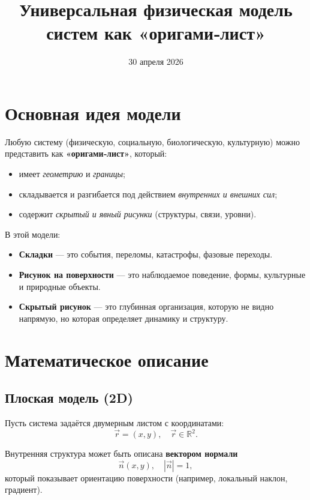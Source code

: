 \documentclass[12pt]{article}
\title{Универсальная физическая модель\\систем как «оригами‑лист»}
\author{}
\date{30 апреля 2026}
\begin{document}
\maketitle

\tableofcontents
\newpage

\section{Основная идея модели}

Любую систему (физическую, социальную, биологическую, культурную) можно представить как \textbf{«оригами‑лист»}, который:

\begin{itemize}
  \item имеет \emph{геометрию} и \emph{границы};
  \item складывается и разгибается под действием \emph{внутренних и внешних сил};
  \item содержит \emph{скрытый и явный рисунки} (структуры, связи, уровни).
\end{itemize}

В этой модели:
\begin{itemize}
  \item \textbf{Складки} — это события, переломы, катастрофы, фазовые переходы.
  \item \textbf{Рисунок на поверхности} — это наблюдаемое поведение, формы, культурные и природные объекты.
  \item \textbf{Скрытый рисунок} — это глубинная организация, которую не видно напрямую, но которая определяет динамику и структуру.
\end{itemize}

\section{Математическое описание}

\subsection{Плоская модель (2D)}

Пусть система задаётся двумерным листом с координатами:
\[
 \vec{r} = (x, y),\quad \vec{r} \in \mathbb{R}^2.
\]

Внутренняя структура может быть описана \textbf{вектором нормали}
\[
 \vec{n}(x,y),\quad |\vec{n}| = 1,
\]
который показывает ориентацию поверхности (например, локальный наклон, градиент).
\end{document}
